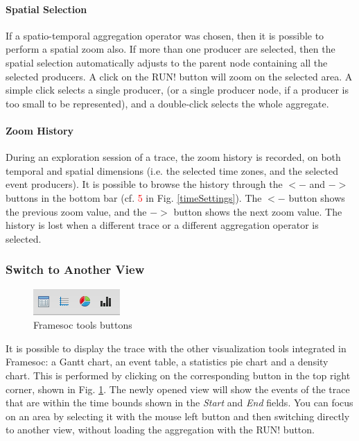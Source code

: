 \documentclass[twoside]{article}
\begin{document}
\begin{sloppypar}
\paragraph{Spatial Selection}
If a spatio-temporal aggregation operator was chosen, then it is possible to perform a spatial zoom also. If more than one producer are selected, then the spatial selection automatically adjusts to the parent node containing all the selected producers. A click on the RUN! button will zoom on the selected area. A simple click selects a single producer, (or a single producer node, if a producer is too small to be represented), and a double-click selects the whole aggregate.

\paragraph{Zoom History}
During an exploration session of a trace, the zoom history is recorded, on both temporal and spatial dimensions (i.e. the selected time zones, and the selected event producers). It is possible to browse the history through the $<-$ and $->$ buttons in the bottom bar (cf. \textcolor{red}{5} in Fig. \ref{timeSettings}). The $<-$ button shows the previous zoom value, and the $->$ button shows the next zoom value. The history is lost when a different trace or a different aggregation operator is selected.

\subsubsection{Switch to Another View}
\begin{figure}[h!]
	\centering
	\includegraphics[scale=1.0]{images/framesoc_buttons.png}
	\caption{Framesoc tools buttons}
	\label{framesocTools}
\end{figure}
It is possible to display the trace with the other visualization tools integrated in Framesoc: a Gantt chart, an event table, a statistics pie chart and a density chart. This is performed by clicking on the corresponding button in the top right corner, shown in Fig. \ref{framesocTools}. The newly opened view will show the events of the trace that are within the time bounds shown in the \textit{Start} and \textit{End} fields. You can focus on an area by selecting it with the mouse left button and then switching directly to another view, without loading the aggregation with the RUN! button. 


\end{sloppypar}
\end{document}
